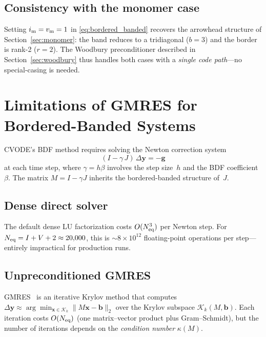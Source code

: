 \documentclass[11pt]{article}
\newcommand{\Neq}{N_{\rm eq}}
\newcommand{\im}{i_{\rm m}}
\newcommand{\vm}{v_{\rm m}}
\newcommand{\bw}{b}
\newcommand{\rank}{r}
\begin{document}
\subsection{Consistency with the monomer case}

Setting $\im = \vm = 1$ in \eqref{eq:bordered_banded} recovers the
arrowhead structure of Section~\ref{sec:monomer}: the band reduces to
a tridiagonal ($\bw = 3$) and the border is rank-2 ($\rank = 2$).
The Woodbury preconditioner described in Section~\ref{sec:woodbury}
thus handles both cases with a \emph{single code path}---no
special-casing is needed.

\section{Limitations of GMRES for Bordered-Banded Systems}
\label{sec:gmres}

CVODE's BDF method requires solving the Newton correction system
\begin{equation}
  (I - \gamma\,J)\,\Delta\mathbf{y} = -\mathbf{g}
  \label{eq:newton}
\end{equation}
at each time step, where $\gamma = h\beta$ involves the step size~$h$
and the BDF coefficient~$\beta$. The matrix $M = I - \gamma J$ inherits
the bordered-banded structure of~$J$.

\subsection{Dense direct solver}

The default dense LU factorization costs $O(\Neq^{3})$ per Newton
step. For $\Neq = I + V + 2 \approx 20{,}000$, this is
$\sim 8 \times 10^{12}$ floating-point operations per step---entirely
impractical for production runs.

\subsection{Unpreconditioned GMRES}

GMRES~\cite{SaadSchultz1986} is an iterative Krylov method that
computes
$\Delta\mathbf{y} \approx \arg\min_{\mathbf{x} \in \mathcal{K}_{k}}
\|M\mathbf{x} - \mathbf{b}\|_{2}$
over the Krylov subspace $\mathcal{K}_{k}(M,\mathbf{b})$.
Each iteration costs $O(\Neq)$ (one matrix--vector product plus
Gram--Schmidt), but the number of iterations depends on the
\emph{condition number} $\kappa(M)$.
\end{document}
